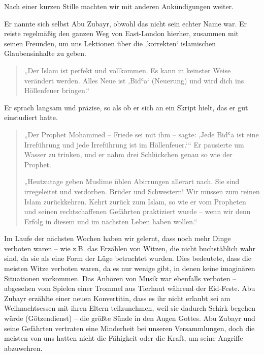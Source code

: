 \documentclass[12pt]{memoir}
\def\`{ʿ} %
\begin{document}
Nach einer kurzen Stille machten wir mit anderen Ankündigungen weiter.

Er nannte sich selbst Abu Zubayr, obwohl das nicht sein echter Name war.
Er reiste regelmäßig den ganzen Weg von East-London hierher,
zusammen mit seinen Freunden, um uns Lektionen über die ‚korrekten‘
islamischen Glaubensinhalte zu geben.

\begin{quote}
„Der Islam ist perfekt und vollkommen.
Es kann in keinster Weise verändert werden.
Alles Neue ist ‚Bid\`a‘ (Neuerung) und wird dich ins Höllenfeuer bringen.“
\end{quote}

Er sprach langsam und präzise,
so als ob er sich an ein Skript hielt,
das er gut einstudiert hatte.

\begin{quote}
„Der Prophet Mohammed – Friede sei mit ihm – sagte:
‚Jede Bid\`a ist eine Irreführung und jede Irreführung ist im Höllenfeuer.‘“
Er pausierte um Wasser zu trinken,
und er nahm drei Schlückchen genau so wie der Prophet.

„Heutzutage geben Muslime üblen Abirrungen allerart nach.
Sie sind irregeleitet und verdorben.
Brüder und Schwestern!
Wir müssen zum reinen Islam zurückkehren.
Kehrt zurück zum Islam, so wie er vom Propheten
und seinen rechtschaffenen Gefährten praktiziert wurde –
wenn wir denn Erfolg in diesem und im nächsten Leben haben wollen.“
\end{quote}

Im Laufe der nächsten Wochen haben wir gelernt,
dass noch mehr Dinge verboten waren –
wie z.B. das Erzählen von Witzen, die nicht buchstäblich wahr sind,
da sie als eine Form der Lüge betrachtet wurden.
Dies bedeutete, dass die meisten Witze verboten waren,
da es nur wenige gibt, in denen keine imaginären Situationen vorkommen.
Das Anhören von Musik war ebenfalls verboten –
abgesehen vom Spielen einer Trommel aus Tierhaut während der Eid-Feste.
Abu Zubayr erzählte einer neuen Konvertitin,
dass es ihr nicht erlaubt sei am Weihnachtsessen mit ihren Eltern teilzunehmen,
weil sie dadurch Schirk begehen würde (Götzendienst) –
die größte Sünde in den Augen Gottes.
Abu Zubayr und seine Gefährten vertraten
eine Minderheit bei unseren Versammlungen,
doch die meisten von uns hatten nicht die Fähigkeit
oder die Kraft, um seine Angriffe abzuwehren.
\end{document}
